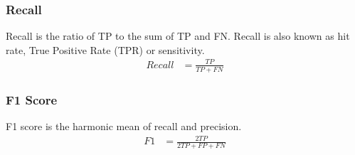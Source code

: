 \documentclass[a4paper,12pt,twoside]{report}
\begin{document}
\subsubsection{Recall} 
Recall is the ratio of TP to the sum of TP and FN. Recall is also known as hit rate, True Positive Rate (TPR) or sensitivity.
\begin{align*}
Recall &= \frac{TP}{TP +FN}
\end{align*}

\subsubsection{F1 Score} 
F1 score is the harmonic mean of recall and precision. 
\begin{align*}
F1 &= \frac{2TP}{2TP + FP + FN}
\end{align*}
\end{document}
